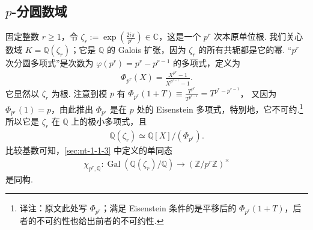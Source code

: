 \subsection{\texorpdfstring{$p$}{p}-分圆数域}\label{sec:nt-2-5-7}
固定整数 $r\geq1$，令 $\zeta_r:=\exp(\frac{2i\pi}{p^r})\in\mathbb C$，这是一个 $p^r$ 次本原单位根.
我们关心数域 $K=\mathbb Q(\zeta_r)$；它是 $\mathbb Q$ 的 Galois 扩张，因为 $\zeta_r$ 的所有共轭都是它的幂.
``$p^r$ 次分圆多项式''是次数为 $\varphi(p^r)=p^r-p^{r-1}$ 的多项式，定义为
\begin{align*}
\Phi_{p^r}(X)=\frac{X^{p^r}-1}{X^{p^{r-1}}-1}.
\end{align*}
它显然以 $\zeta_r$ 为根.
注意到模 $p$ 有
$\Phi_{p^r}(1+T)\equiv\frac{T^{p^r}}{T^{p^{r-1}}}=T^{p^r-p^{r-1}}$，
又因为 $\Phi_{p^r}(1)=p$，由此推出 $\Phi_{p^r}$ 是在 $p$ 处的 Eisenstein 多项式，特别地，它不可约.\footnote{译注：原文此处写 $\Phi_{p^r}$；满足 Eisenstein 条件的是平移后的 $\Phi_{p^r}(1+T)$，后者的不可约性也给出前者的不可约性.}
所以它是 $\zeta_r$ 在 $\mathbb Q$ 上的极小多项式，且
\begin{align*}
\mathbb Q(\zeta_r)\simeq\mathbb Q[X]/(\Phi_{p^r}).
\end{align*}
比较基数可知，\ref{sec:nt-1-1-3} 中定义的单同态
\begin{align*}
\chi_{p^r,\mathbb Q}\colon
\operatorname{Gal}(\mathbb Q(\zeta_r)/\mathbb Q)
\longrightarrow(\mathbb Z/p^r\mathbb Z)^\times
\end{align*}
是同构.

